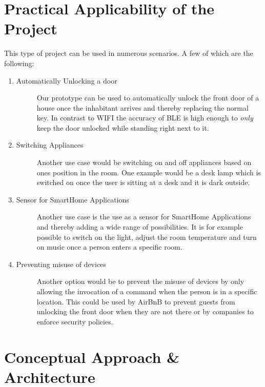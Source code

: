 \documentclass[
10pt, %
a4paper, %
oneside, %
headinclude,footinclude, %
BCOR5mm, %
]{scrartcl}
\begin{document}
\section{Practical Applicability of the Project}
This type of project can be used in numerous scenarios. A few of which are the following:
\begin{enumerate}
\item 
	\begin{description}
	\item[Automatically Unlocking a door] Our prototype can be used to automatically unlock the front door of a house once the inhabitant arrives and thereby replacing the normal key. In contrast to WIFI the accuracy of BLE is high enough to \emph{only} keep the door unlocked while standing right next to it.
	\end{description}
	\item 
	\begin{description}
	\item[Switching Appliances] Another use case would be switching on and off appliances based on ones position in the room. One example would be a desk lamp which is switched on once the user is sitting at a desk and it is dark outside.
	\end{description}
	\item
	\begin{description}
	\item[Sensor for SmartHome Applications] Another use case is the use as a sensor for SmartHome Applications and thereby adding a wide range of possibilities. It is for example possible to switch on the light, adjust the room temperature and turn on music once a person enters a specific room.
	\end{description}
	\item
	\begin{description}
	\item[Preventing misuse of devices] Another option would be to prevent the misuse of devices by only allowing the invocation of a command when the person is in a specific location. This could be used by AirBnB to prevent guests from unlocking the front door when they are not there or by companies to enforce security policies.
	\end{description}
\end{enumerate}

\section{Conceptual Approach \& Architecture}
\end{document}

